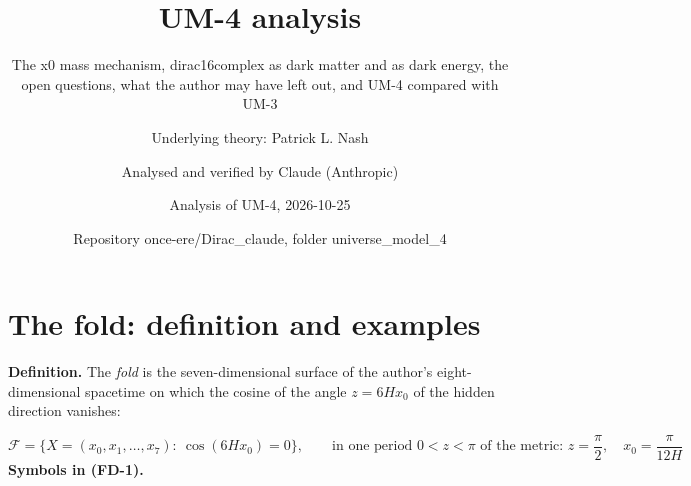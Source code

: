 \documentclass[
  10pt,
]{article}
\title{UM-4 analysis}
\subtitle{The x0 mass mechanism, dirac16complex as dark matter and as
dark energy, the open questions, what the author may have left out, and
UM-4 compared with UM-3}
\author{Underlying theory: Patrick L. Nash \and Analysed and verified by
Claude (Anthropic) \and Analysis of UM-4, 2026-10-25 \and Repository
once-ere/Dirac\_claude, folder universe\_model\_4}
\date{}
\begin{document}
\maketitle

{
\hypersetup{linkcolor=}
\setcounter{tocdepth}{3}
\tableofcontents
}
\hypertarget{the-fold-definition-and-examples}{%
\section{The fold: definition and
examples}\label{the-fold-definition-and-examples}}

\textbf{Definition.} The \emph{fold} is the seven-dimensional surface of
the author's eight-dimensional spacetime on which the cosine of the
angle \(z = 6Hx_0\) of the hidden direction vanishes:

\[
\mathcal{F} = \big\{X = (x_0, x_1, \dots, x_7):\ \cos(6Hx_0) = 0\big\},\qquad
\text{in one period } 0 < z < \pi\text{ of the metric: } z = \frac{\pi}{2},\quad x_0 = \frac{\pi}{12H} \tag{FD-1}
\] \textbf{Symbols in (FD-1).}
\end{document}
